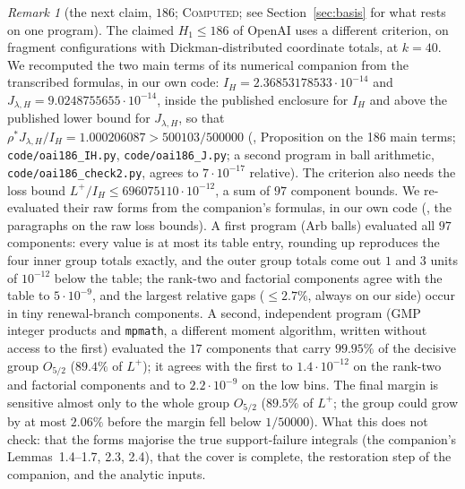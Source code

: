 \documentclass[11pt]{amsart}
\theoremstyle{definition}
\theoremstyle{remark}
\newtheorem{remark}[theorem]{Remark}
\newcommand{\lbl}[1]{\textup{\textsc{#1}}}
\begin{document}
\begin{remark}[the next claim, $186$; \lbl{Computed}; see Section~\ref{sec:basis} for what rests on one program]\label{rem:186}
The claimed $H_1\le186$ of OpenAI \cite{OAI26} uses a different criterion,
on fragment configurations with Dickman-distributed coordinate totals, at
$k=40$. We recomputed the two main terms of its numerical companion from the
transcribed formulas, in our own code: $I_H=2.36853178533\cdot10^{-14}$ and
$J_{\lambda,H}=9.0248755655\cdot10^{-14}$, inside the published enclosure for
$I_H$ and above the published lower bound for $J_{\lambda,H}$, so that
$\rho^*J_{\lambda,H}/I_H=1.000206087>500103/500000$ (\cite{Kim26},
Proposition on the 186 main terms; \texttt{code/oai186\_IH.py},
\texttt{code/oai186\_J.py}; a second program in ball arithmetic,
\texttt{code/oai186\_check2.py}, agrees to $7\cdot10^{-17}$ relative). The criterion
also needs the loss bound $L^+/I_H\le696075110\cdot10^{-12}$, a sum of $97$
component bounds. We re-evaluated their raw forms from the companion's
formulas, in our own code (\cite{Kim26}, the paragraphs on the raw loss
bounds). A first program (Arb balls) evaluated all $97$ components: every value
is at most its table entry, rounding up reproduces the four inner group totals
exactly, and the outer group totals come out $1$ and $3$ units of $10^{-12}$
below the table; the rank-two and factorial components agree with the table to
$5\cdot10^{-9}$, and the largest relative gaps ($\le2.7\%$, always on our
side) occur in tiny renewal-branch components. A second, independent program
(GMP integer products and \texttt{mpmath}, a different moment algorithm,
written without access to the first) evaluated the $17$ components that carry
$99.95\%$ of the decisive group $O_{5/2}$ ($89.4\%$ of $L^+$); it agrees with the
first to $1.4\cdot10^{-12}$ on the rank-two and factorial components and to
$2.2\cdot10^{-9}$ on the low bins. The final
margin is sensitive almost only to the whole group $O_{5/2}$ ($89.5\%$ of
$L^+$; the group could grow by at most $2.06\%$ before the margin fell below
$1/50000$). What this does not check: that the forms majorise the true
support-failure integrals (the companion's Lemmas~1.4--1.7, 2.3, 2.4), that the
cover is complete, the restoration step of the companion, and the analytic
inputs.
\end{remark}
\end{document}

